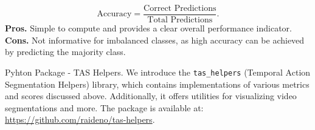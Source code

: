 $$
\text{Accuracy} = \frac{\text{Correct Predictions}}{\text{Total Predictions}}.
$$
\noindent\textbf{\small{Pros.}} Simple to compute and provides a clear overall performance indicator. \textbf{\small{Cons.}} Not informative for imbalanced classes, as high accuracy can be achieved by predicting the majority class.

\begin{AIbox}{Pyhton Package - TAS Helpers.}
    We introduce the \texttt{tas\_helpers} (Temporal Action Segmentation Helpers) library, which contains implementations of various metrics and scores discussed above. Additionally, it offers utilities for visualizing video segmentations and more. The package is available at: \url{https://github.com/raideno/tas-helpers}.
\end{AIbox}
